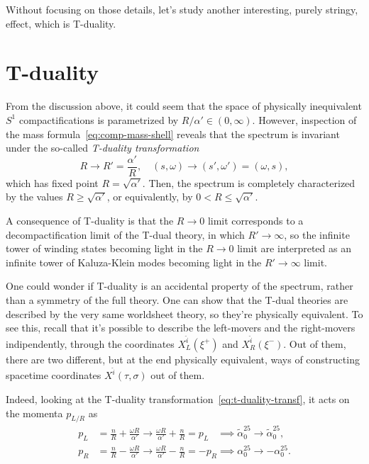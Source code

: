 Without focusing on those details, let's study another interesting, purely stringy, effect, which is T-duality.

\section{T-duality}
From the discussion above, it could seem that the space of physically inequivalent $S^1$ compactifications is parametrized by $R/\alpha' \in (0,\infty)$. However, inspection of the mass formula~\eqref{eq:comp-mass-shell} reveals that the spectrum is invariant under the so-called \emph{T-duality transformation}
\begin{equation}\label{eq:t-duality-transf}
    R \to R' = \frac{\alpha'}{R}, \quad (s,\omega) \to (s',\omega') = (\omega, s) ,
\end{equation}
which has fixed point $R = \sqrt{\alpha'}$. Then, the spectrum is completely characterized by the values $R \geq \sqrt{\alpha'}$, or equivalently, by $0 < R \leq \sqrt{\alpha'}$.

A consequence of T-duality is that the $R \to 0$ limit corresponds to a decompactification limit of the T-dual theory, in which $R' \to \infty$, so the infinite tower of winding states becoming light in the $R \to 0$ limit are interpreted as an infinite tower of Kaluza-Klein modes becoming light in the $R' \to \infty$ limit.


One could wonder if T-duality is an accidental property of the spectrum, rather than a symmetry of the full theory. One can show that the T-dual theories are described by the very same worldsheet theory, so they're physically equivalent. To see this, recall that it's possible to describe the left-movers and the right-movers indipendently, through the coordinates $X^{\hat{i}}_L(\xi^+)$ and $X^{\hat{i}}_R(\xi^-)$. Out of them, there are two different, but at the end physically equivalent, ways of constructing spacetime coordinates $X^{\hat{i}}(\tau,\sigma)$ out of them. 

Indeed, looking at the T-duality transformation~\eqref{eq:t-duality-transf}, it acts on the momenta $p_{L/R}$ as
\begin{equation}\label{eq:t-duality-momenta}
\begin{aligned}
    p_L &= \frac{n}{R} + \frac{\omega R}{\alpha'} \to \frac{\omega R}{\alpha'} + \frac{n}{R} = p_L \; \; \; \implies \tilde{\alpha}^{25}_0 \to \tilde{\alpha}^{25}_0 ,\\
    p_R &= \frac{n}{R} - \frac{\omega R}{\alpha'} \to \frac{\omega R}{\alpha'} - \frac{n}{R} = - p_R \implies {\alpha}^{25}_0 \to -{\alpha}^{25}_0 .
\end{aligned}
\end{equation}

